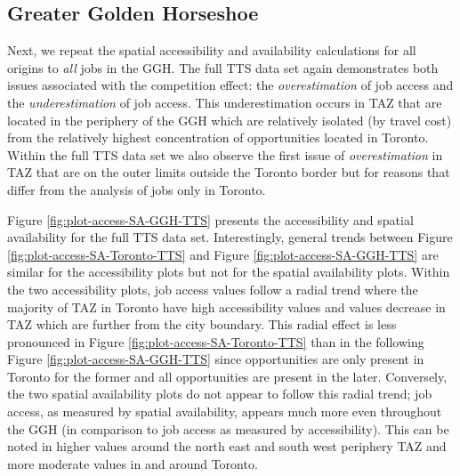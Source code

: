 \documentclass[]{elsarticle} %
\begin{document}
\hypertarget{greater-golden-horseshoe}{%
\subsection{Greater Golden Horseshoe}\label{greater-golden-horseshoe}}

Next, we repeat the spatial accessibility and availability calculations
for all origins to \emph{all} jobs in the GGH. The full TTS data set
again demonstrates both issues associated with the competition effect:
the \emph{overestimation} of job access and the \emph{underestimation}
of job access. This underestimation occurs in TAZ that are located in
the periphery of the GGH which are relatively isolated (by travel cost)
from the relatively highest concentration of opportunities located in
Toronto. Within the full TTS data set we also observe the first issue of
\emph{overestimation} in TAZ that are on the outer limits outside the
Toronto border but for reasons that differ from the analysis of jobs
only in Toronto.

Figure \ref{fig:plot-access-SA-GGH-TTS} presents the accessibility and
spatial availability for the full TTS data set. Interestingly, general
trends between Figure \ref{fig:plot-access-SA-Toronto-TTS} and Figure
\ref{fig:plot-access-SA-GGH-TTS} are similar for the accessibility plots
but not for the spatial availability plots. Within the two accessibility
plots, job access values follow a radial trend where the majority of TAZ
in Toronto have high accessibility values and values decrease in TAZ
which are further from the city boundary. This radial effect is less
pronounced in Figure \ref{fig:plot-access-SA-Toronto-TTS} than in the
following Figure \ref{fig:plot-access-SA-GGH-TTS} since opportunities
are only present in Toronto for the former and all opportunities are
present in the later. Conversely, the two spatial availability plots do
not appear to follow this radial trend; job access, as measured by
spatial availability, appears much more even throughout the GGH (in
comparison to job access as measured by accessibility). This can be
noted in higher values around the north east and south west periphery
TAZ and more moderate values in and around Toronto.
\end{document}
